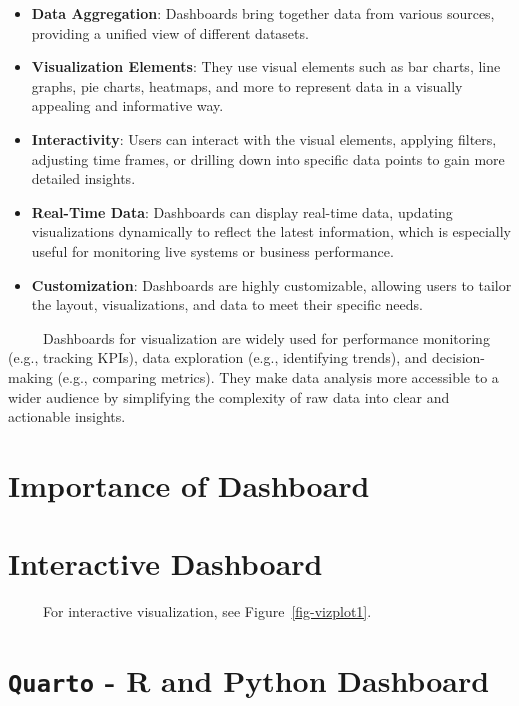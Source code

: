 \documentclass[
  letterpaper,
  DIV=11,
  numbers=noendperiod]{scrreprt}
\begin{document}
\begin{itemize}
\item
  \textbf{Data Aggregation}: Dashboards bring together data from various
  sources, providing a unified view of different datasets.
\item
  \textbf{Visualization Elements}: They use visual elements such as bar
  charts, line graphs, pie charts, heatmaps, and more to represent data
  in a visually appealing and informative way.
\item
  \textbf{Interactivity}: Users can interact with the visual elements,
  applying filters, adjusting time frames, or drilling down into
  specific data points to gain more detailed insights.
\item
  \textbf{Real-Time Data}: Dashboards can display real-time data,
  updating visualizations dynamically to reflect the latest information,
  which is especially useful for monitoring live systems or business
  performance.
\item
  \textbf{Customization}: Dashboards are highly customizable, allowing
  users to tailor the layout, visualizations, and data to meet their
  specific needs.
\end{itemize}

~~~~~Dashboards for visualization are widely used for performance
monitoring (e.g., tracking KPIs), data exploration (e.g., identifying
trends), and decision-making (e.g., comparing metrics). They make data
analysis more accessible to a wider audience by simplifying the
complexity of raw data into clear and actionable insights.

\section{Importance of Dashboard}\label{importance-of-dashboard}

\section{Interactive Dashboard}\label{interactive-dashboard}

~~~~~For interactive visualization, see Figure~\ref{fig-vizplot1}. ~~~~~

\section{\texorpdfstring{\texttt{Quarto} - R and Python
Dashboard}{Quarto - R and Python Dashboard}}\label{quarto---r-and-python-dashboard}
\end{document}
